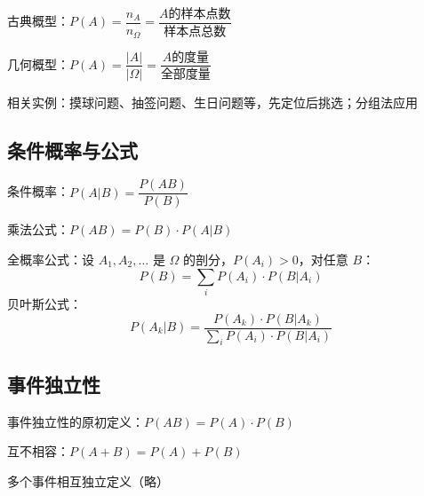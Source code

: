 \documentclass[UTF8]{ctexart}
\begin{document}
古典概型：$P(A) = \dfrac{n_A}{n_\varOmega} = \dfrac{A \text{的样本点数}}{\text{样本点总数}}$

\vspace{0.6em}
几何概型：$P(A) = \dfrac{|A|}{|\varOmega|} = \dfrac{A \text{的度量}}{\text{全部度量}}$

相关实例：摸球问题、抽签问题、生日问题等，先定位后挑选；分组法应用

\subsection{条件概率与公式}
条件概率：$P(A|B) = \dfrac{P(AB)}{P(B)}$

乘法公式：$P(AB) = P(B)\cdot P(A|B)$

全概率公式：设 $A_1,A_2,\dots$ 是 $\varOmega$ 的剖分，$P(A_i)>0$，对任意 $B$：
\begin{equation}\label{eq:全概率公式}
    P(B) = \sum\limits_{i} P(A_i)\cdot P(B|A_i)
\end{equation}
贝叶斯公式：
\begin{equation}\label{eq:贝叶斯公式}
    P(A_k|B) = \dfrac{P(A_k)\cdot P(B|A_k)}{\sum\limits_{i} P(A_i)\cdot P(B|A_i)}
\end{equation}

\subsection{事件独立性}
事件独立性的原初定义：$P(AB)=P(A)\cdot P(B)$

互不相容：$P(A+B)=P(A)+P(B)$

多个事件相互独立定义（略）
\end{document}
